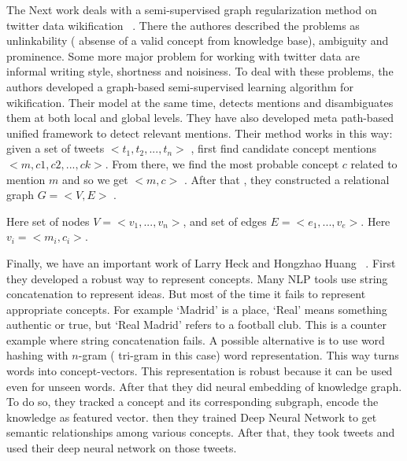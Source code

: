 The Next work deals with a semi-supervised graph regularization method on 
twitter data wikification ~\cite{ref4tw-wiki}. There the authores described the problems as unlinkability 
( absense of a valid concept from knowledge base), ambiguity and prominence. Some more major problem for working
with twitter data are informal writing style, shortness and noisiness. To deal with these problems, the authors 
developed a graph-based semi-supervised learning algorithm for wikification. Their model at the same time, detects 
mentions and disambiguates them at both local and global levels. They have also developed meta path-based unified framework
to detect relevant mentions. Their method works in this way: given a set of tweets $<t_1,t_2,... ,t_n>$ ,
first find candidate concept mentions $<m,c1,c2,...,ck>$. From there, we find the most probable concept $c$
related to  mention $m$ and so we get $<m,c>$ . After that , they constructed a relational graph $G= <V,E>$ .

Here set of nodes $V = <v_1,...,v_n>$, and set of edges $E = <e_1,...,v_e>$. Here $v_i = <m_i, c_i>$. 

Finally, we have an important work of Larry Heck and Hongzhao Huang ~\cite{ref1DeepLearning}. 
First they developed a robust way to represent concepts.
 Many NLP tools use string concatenation to represent ideas.
But most of the time it fails to represent appropriate concepts. For example `Madrid' is a place, `Real'
 means 
something authentic or true, but `Real Madrid' refers to a football club. 
This is a counter example where string concatenation fails.
A possible alternative is to use word hashing with $n$-gram ( tri-gram in this case) 
word representation. This way turns words into concept-vectors. This representation is 
robust because it can be used even for unseen words. After that they did neural embedding of knowledge graph. 
 To do so, they tracked a concept and its corresponding subgraph, encode the knowledge as featured vector.
 then they trained Deep Neural Network to get semantic relationships among various concepts.
After that, they took tweets and used their deep neural network on those tweets.
\endinput